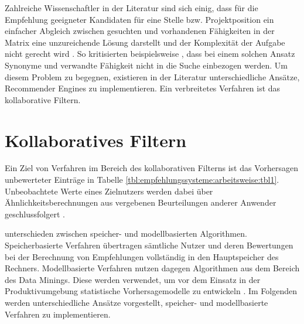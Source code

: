 Zahlreiche Wissenschaftler in der Literatur sind sich einig, dass für die Empfehlung geeigneter Kandidaten für eine Stelle bzw. Projektposition ein einfacher Abgleich zwischen gesuchten und vorhandenen Fähigkeiten in der Matrix eine unzureichende Lösung darstellt \cite[S. 1]{enhancingERecruitment:2012}\cite[S. 1]{faerber:2003}\cite[S. 2]{prospect:2010} und der Komplexität der Aufgabe nicht gerecht wird \cite[S. 1]{malinowski:2008}. So kritisierten beispielsweise \textcite[S. 1f.]{mitre:2014}, dass bei einem solchen Ansatz Synonyme und verwandte Fähigkeit nicht in die Suche einbezogen werden. Um diesem Problem zu begegnen, existieren in der Literatur unterschiedliche Ansätze, Recommender Engines zu implementieren. Ein verbreitetes Verfahren ist das kollaborative Filtern.

\section{Kollaboratives Filtern}
\label{ch:empfehlungssysteme:cf}
Ein Ziel von Verfahren im Bereich des kollaborativen Filterns ist das Vorhersagen unbewerteter Einträge in Tabelle \ref{tbl:empfehlungssysteme:arbeitsweise:tbl1}. Unbeobachtete Werte eines Zielnutzers werden dabei über Ähnlichkeitsberechnungen aus vergebenen Beurteilungen anderer Anwender geschlussfolgert \cite[S. 1]{su:2009}.

\textcite[S. 3]{breese:1998} unterschieden zwischen speicher- und modellbasierten Algorithmen. Speicherbasierte Verfahren übertragen sämtliche Nutzer und deren Bewertungen bei der Berechnung von Empfehlungen vollständig in den Hauptspeicher des Rechners. Modellbasierte Verfahren nutzen dagegen Algorithmen aus dem Bereich des Data Minings. Diese werden verwendet, um vor dem Einsatz in der Produktivumgebung statistische Vorhersagemodelle zu entwickeln \cite[S. 3]{breese:1998}\cite[S. 11]{schafer:2007}. Im Folgenden werden unterschiedliche Ansätze vorgestellt, speicher- und modellbasierte Verfahren zu implementieren.

